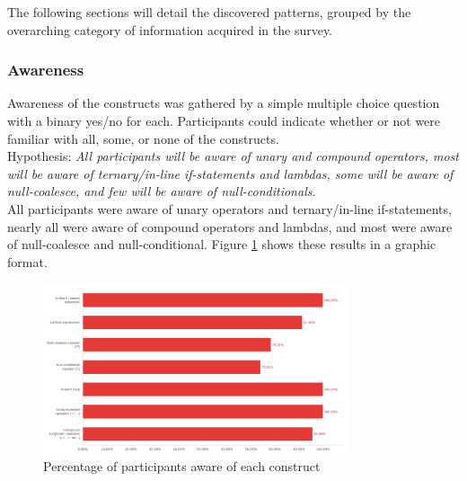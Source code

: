 \documentclass{article}
\begin{document}
        The following sections will detail the discovered patterns, grouped by the overarching category of information acquired in the survey.
        \subsubsection{Awareness}
            Awareness of the constructs was gathered by a simple multiple choice question with a binary yes/no for each. Participants could indicate whether or not were familiar with all, some, or none of the constructs.
            \\\newline
            Hypothesis: \textit{All participants will be aware of unary and compound operators, most will be aware of ternary/in-line if-statements and lambdas, some will be aware of null-coalesce, and few will be aware of null-conditionals.}
            \\\newline
            All participants were aware of unary operators and ternary/in-line if-statements, nearly all were aware of compound operators and lambdas, and most were aware of null-coalesce and null-conditional. Figure \ref{fig:awareness} shows these results in a graphic format.

            \begin{figure}[htbp]
                \centering
                \includegraphics[width=0.8\textwidth]{awareness}
                \caption{Percentage of participants aware of each construct}
                \label{fig:awareness}
            \end{figure}
\end{document}
